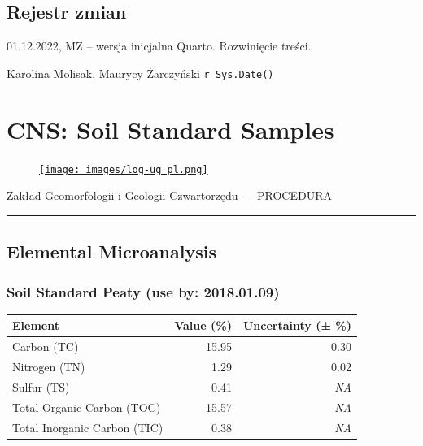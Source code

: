 \documentclass[
  letterpaper,
  DIV=11,
  numbers=noendperiod]{scrreprt}
\begin{document}
\hypertarget{rejestr-zmian-3}{%
\section{Rejestr zmian}\label{rejestr-zmian-3}}

01.12.2022, MZ -- wersja inicjalna Quarto. Rozwinięcie treści.

Karolina Molisak, Maurycy Żarczyński \texttt{r\ Sys.Date()}

\hypertarget{cns-soil-standard-samples}{%
\chapter{CNS: Soil Standard Samples}\label{cns-soil-standard-samples}}

\begin{figure}

\href{https://geomorfologia.ug.edu.pl}{\texttt{[image: images/log-ug\_pl.png]}}

\end{figure}

Zakład Geomorfologii i Geologii Czwartorzędu --- PROCEDURA

\begin{center}\rule{0.5\linewidth}{0.5pt}\end{center}

\hypertarget{elemental-microanalysis}{%
\section{Elemental Microanalysis}\label{elemental-microanalysis}}

\hypertarget{soil-standard-peaty-use-by-2018.01.09}{%
\subsection{Soil Standard Peaty (use by:
2018.01.09)}\label{soil-standard-peaty-use-by-2018.01.09}}

\begin{longtable}[]{@{}lrr@{}}
\toprule\noalign{}
Element & Value (\%) & Uncertainty (± \%) \\
\midrule\noalign{}
\endhead
\bottomrule\noalign{}
\endlastfoot
Carbon (TC) & 15.95 & 0.30 \\
Nitrogen (TN) & 1.29 & 0.02 \\
Sulfur (TS) & 0.41 & \emph{NA} \\
Total Organic Carbon (TOC) & 15.57 & \emph{NA} \\
Total Inorganic Carbon (TIC) & 0.38 & \emph{NA} \\
\end{longtable}
\end{document}
